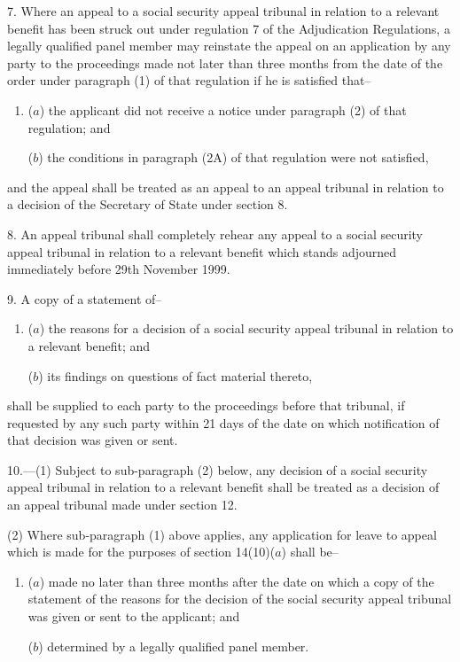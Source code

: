 \documentclass[12pt,a4paper]{article}
\begin{document}
\medskip

7.  Where an appeal to a social security appeal tribunal in relation to a relevant benefit has been struck out under regulation 7 of the Adjudication Regulations, a legally qualified panel member may reinstate the appeal on an application by any party to the proceedings made not later than three months from the date of the order under paragraph (1) of that regulation if he is satisfied that–
\begin{enumerate}\item[]
($a$) the applicant did not receive a notice under paragraph (2) of that regulation; and

($b$) the conditions in paragraph (2A) of that regulation were not satisfied,
\end{enumerate}
and the appeal shall be treated as an appeal to an appeal tribunal in relation to a decision of the Secretary of State under section 8.

\medskip

8.  An appeal tribunal shall completely rehear any appeal to a social security appeal tribunal in relation to a relevant benefit which stands adjourned immediately before 29th November 1999.

\medskip

9.  A copy of a statement of–
\begin{enumerate}\item[]
($a$) the reasons for a decision of a social security appeal tribunal in relation to a relevant benefit; and

($b$) its findings on questions of fact material thereto,
\end{enumerate}
shall be supplied to each party to the proceedings before that tribunal, if requested by any such party within 21 days of the date on which notification of that decision was given or sent.

\medskip

10.---(1)  Subject to sub-paragraph (2) below, any decision of a social security appeal tribunal in relation to a relevant benefit shall be treated as a decision of an appeal tribunal made under section 12.

(2) Where sub-paragraph (1) above applies, any application for leave to appeal which is made for the purposes of section 14(10)($a$)  shall be–
\begin{enumerate}\item[]
($a$) made no later than three months after the date on which a copy of the statement of the reasons for the decision of the social security appeal tribunal was given or sent to the applicant; and

($b$) determined by a legally qualified panel member.
\end{enumerate}
\end{document}

